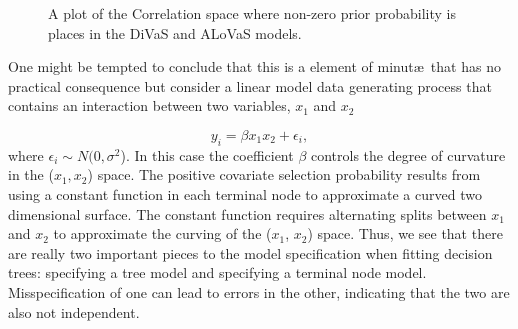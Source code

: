 \begin{figure}[H]
\begin{center}
\end{center}
\caption{A plot of the Correlation space where non-zero prior probability is places in the DiVaS and ALoVaS models.}
\label{fig:corr_divas_alovas}
\end{figure}



One might be tempted to conclude that this is a element of minut\ae\ that has no practical consequence but consider a linear model data generating process that contains an interaction between two variables, $x_1$ and $x_2$

\begin{equation}\label{eqn:interaction_model}
y_i = \beta x_1x_2 + \epsilon_i,
\end{equation}  
where $\epsilon_i \sim N(0, \sigma^2$). In this case the coefficient $\beta$ controls the degree of curvature in the ($x_1, x_2$) space. The positive covariate selection probability results from using a constant function in each terminal node to approximate a curved two dimensional surface. The constant function requires alternating splits between $x_1$ and $x_2$ to approximate the curving of the ($x_1$, $x_2$) space. Thus, we see that there are really two important pieces to the model specification when fitting decision trees: specifying a tree model and specifying a terminal node model. Misspecification of one can lead to errors in the other, indicating that the two are also not independent.


